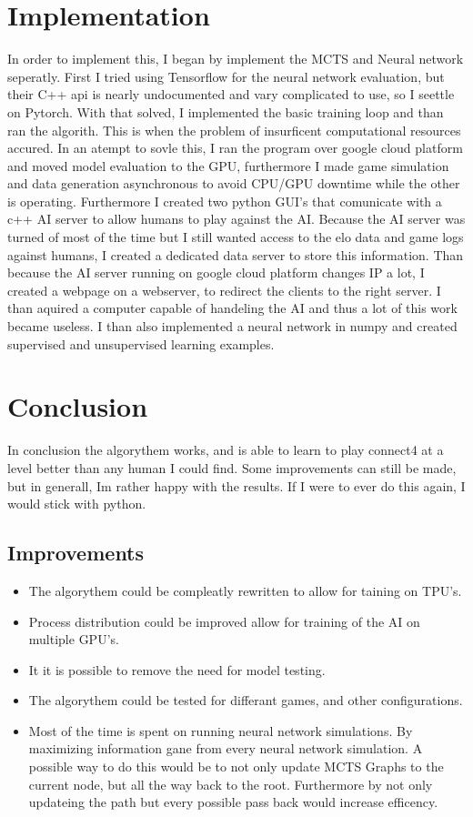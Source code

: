 \documentclass[12pt]{article}
\begin{document}
\section{Implementation}
In order to implement this, I began by implement the MCTS and Neural network seperatly. First I tried using Tensorflow for the neural network evaluation, but their C++ api is nearly undocumented and vary complicated to use, so I seettle on Pytorch. With that solved, I implemented the basic training loop and than ran the algorith. This is when the problem of insurficent computational resources accured. In an atempt to sovle this, I ran the program over google cloud platform and moved model evaluation to the GPU, furthermore I made game simulation and data generation asynchronous to avoid CPU/GPU downtime while the other is operating. Furthermore I created two python GUI's that comunicate with a c++ AI server to allow humans to play against the AI. Because the AI server was turned of most of the time but I still wanted access to the elo data and game logs against humans, I created a dedicated data server to store this information. Than because the AI server running on google cloud platform changes IP a lot, I created a webpage on a webserver, to redirect the clients to the right server. I than aquired a computer capable of handeling the AI and thus a lot of this work became useless. I than also implemented a neural network in numpy and created supervised and unsupervised learning examples.
\section{Conclusion}
In conclusion the algorythem works, and is able to learn to play connect4 at a level better than any human I could find. Some improvements can still be made, but in generall, Im rather happy with the results. If I were to ever do this again, I would stick with python.
\subsection{Improvements}
\begin{itemize}
\item The algorythem could be compleatly rewritten to allow for taining on TPU's.
\item Process distribution could be improved allow for training of the AI on multiple GPU's.
\item It it is possible to remove the need for model testing.
\item The algorythem could be tested for differant games, and other configurations.
\item Most of the time is spent on running neural network simulations. By maximizing information gane from every neural network simulation.  A possible way to do this would be to not only update MCTS Graphs to the current node, but all the way back to the root. Furthermore by not only updateing the path but every possible pass back would increase efficency. 
\end{itemize}
\end{document}
